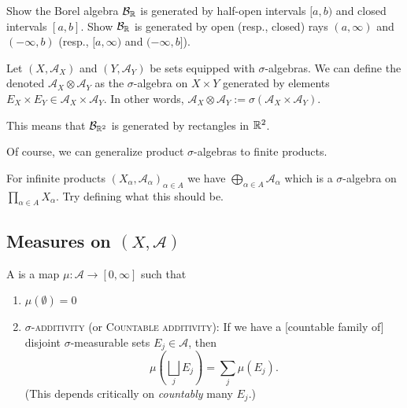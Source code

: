 \begin{xca}
Show the Borel algebra $\mathcal{B}_{\mathbb{R}}$ is generated by half-open
intervals $[a,b)$ and closed intervals $[a,b]$. Show
  $\mathcal{B}_{\mathbb{R}}$ is generated by open (resp., closed) rays
  $(a,\infty)$ and $(-\infty,b)$ (resp.,  $[a,\infty)$ and $(-\infty,b]$).
\end{xca}

\begin{definition}
Let $(X,\mathcal{A}_{X})$ and $(Y,\mathcal{A}_{Y})$ be sets equipped
with $\sigma$-algebras. We can define the 
denoted $\mathcal{A}_{X}\otimes\mathcal{A}_{Y}$ as the
$\sigma$-algebra on $X\times Y$ generated by elements $E_{X}\times E_{Y}\in\mathcal{A}_{X}\times\mathcal{A}_{Y}$.
In other words, $\mathcal{A}_{X}\otimes\mathcal{A}_{Y}:=\sigma(\mathcal{A}_{X}\times\mathcal{A}_{Y})$.
\end{definition}

\begin{node}
This means that $\mathcal{B}_{\mathbb{R}^{2}}$ is generated by rectangles in $\mathbb{R}^{2}$.
\end{node}

\begin{node}
Of course, we can generalize product $\sigma$-algebras to finite products.
\end{node}

\begin{xca}
For infinite products $(X_{\alpha},\mathcal{A}_{\alpha})_{\alpha\in A}$ we have
$\bigoplus_{\alpha\in A}\mathcal{A}_{\alpha}$ which is a
$\sigma$-algebra on $\prod_{\alpha\in A}X_{\alpha}$. Try defining what
this should be.
\end{xca}

\subsection{Measures on $(X,\mathcal{A})$}

\begin{definition}
A  is a map $\mu\colon\mathcal{A}\to[0,\infty]$ such
that
\begin{enumerate}
\item $\mu(\emptyset)=0$
\item\textsc{$\sigma$-additivity} (or \textsc{Countable additivity}): If we have a [countable family of] disjoint
  $\sigma$-measurable sets $E_{j}\in\mathcal{A}$, then
  \begin{equation}
\mu\left(\bigsqcup_{j}E_{j}\right)=\sum_{j}\mu(E_{j}).
  \end{equation}
  (This depends critically on \emph{countably} many $E_{j}$.)
\end{enumerate}
\end{definition}

